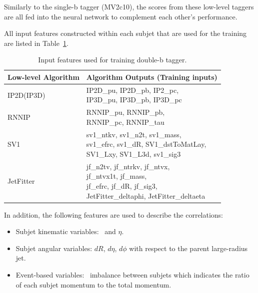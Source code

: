 \par Similarly to the single-b tagger (MV2c10), the scores from these low-level taggers are all fed into the neural network to complement each other's performance.

\par All input features constructed within each subjet that are used for the training are listed in Table~\ref{tab:input}.

\begin{table}[tbh]
    \centering
    \begin{tabular}{|l|l|}
        \hline
        Low-level Algorithm & Algorithm Outputs (Training inputs) \\
        \hline
        \hline
        IP2D(IP3D) & \speciallcell{IP2D\_pu, IP2D\_pb, IP2\_pc,\\ IP3D\_pu, IP3D\_pb, IP3D\_pc} \\
        \hline
        RNNIP & \speciallcell{RNNIP\_pu, RNNIP\_pb,\\ RNNIP\_pc, RNNIP\_tau} \\
        \hline
        SV1 & \speciallcell{sv1\_ntkv, sv1\_n2t, sv1\_mass,\\ sv1\_efrc, sv1\_dR, SV1\_dstToMatLay,\\ SV1\_Lxy, SV1\_L3d, sv1\_sig3} \\
        \hline
        JetFitter & \speciallcell{jf\_n2tv, jf\_ntrkv, jf\_ntvx,\\ jf\_ntvx1t, jf\_mass,\\ jf\_efrc, jf\_dR, jf\_sig3,\\ JetFitter\_deltaphi, JetFitter\_deltaeta} \\
        \hline
    \end{tabular}
    \caption{Input features used for training double-b tagger.}
    \label{tab:input}
\end{table}

\par In addition, the following features are used to describe the correlations:

\begin{itemize}
    \item Subjet kinematic variables: \pt~and $\eta$.
    \item Subjet angular variables: $d R$, $d\eta$, $d\phi$ with respect to the parent large-radius jet.
    \item Event-based variables: \pt~imbalance between subjets which indicates the ratio of each subjet momentum to the total momentum.
\end{itemize}

